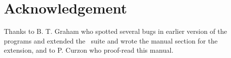 



\pagestyle{fancy}

\setcounter{tocdepth}{2}

\makeindex




   \setcounter{page}{1}                   %

   \tableofcontents                       %

\vspace{10pc}
\section*{Acknowledgement}
Thanks to B. T. Graham who spotted several bugs in earlier version of
the programs and extended the \mweb\ suite and wrote the
manual section for the extension, and to P. Curzon who proof-read this manual.

   \cleardoublepage                      %
   \setcounter{page}{1}                  %










\newpage
{}
\printindex

